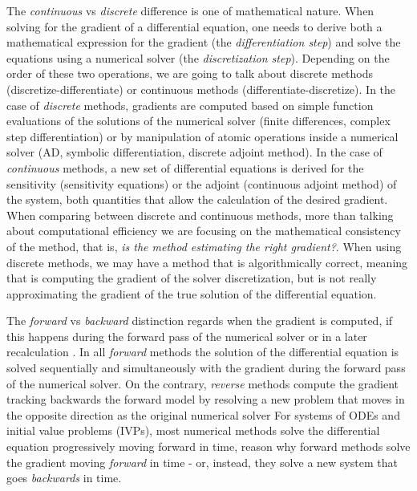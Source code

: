The \textit{continuous} vs \textit{discrete} difference is one of mathematical nature. 
When solving for the gradient of a differential equation, one needs to derive both a mathematical expression for the gradient (the \textit{differentiation step}) and solve the equations using a numerical solver (the \textit{discretization step})\cite{bradley2013pde, Onken_Ruthotto_2020, FATODE2014, Sirkes_Tziperman_1997}. 
Depending on the order of these two operations, we are going to talk about discrete methods (discretize-differentiate) or continuous methods (differentiate-discretize). 
In the case of \textit{discrete} methods, gradients are computed based on simple function evaluations of the solutions of the numerical solver (finite differences, complex step differentiation) or by manipulation of atomic operations inside a numerical solver (AD, symbolic differentiation, discrete adjoint method). 
In the case of \textit{continuous} methods, a new set of differential equations is derived for the sensitivity (sensitivity equations) or the adjoint (continuous adjoint method) of the system, both quantities that allow the calculation of the desired gradient.   
When comparing between discrete and continuous methods, more than talking about computational efficiency we are focusing on the mathematical consistency of the method, that is, \textit{is the method estimating the right gradient?}. 
When using discrete methods, we may have a method that is algorithmically correct, meaning that is computing the gradient of the solver discretization, but is not really approximating the gradient of the true solution of the differential equation. 

The \textit{forward} vs \textit{backward} distinction regards when the gradient is computed, if this happens during the forward pass of the numerical solver or in a later recalculation \cite{Griewank:2008kh}. 
In all \textit{forward} methods the solution of the differential equation is solved sequentially and simultaneously with the gradient during the forward pass of the numerical solver.  
On the contrary, \textit{reverse} methods compute the gradient tracking backwards the forward model by resolving a new problem that moves in the opposite direction as the original numerical solver 
For systems of ODEs and initial value problems (IVPs), most numerical methods solve the differential equation progressively moving forward in time, reason why forward methods solve the gradient moving \textit{forward} in time - or, instead, they solve a new system that goes \textit{backwards} in time.

